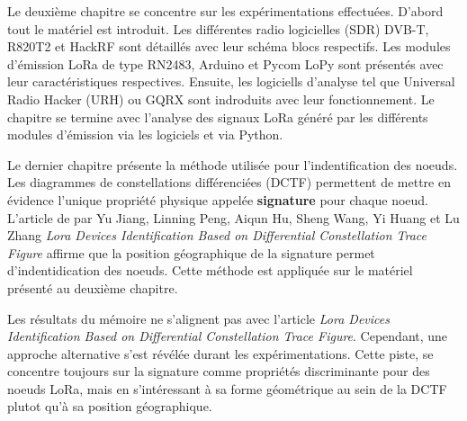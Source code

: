 \documentclass[a4paper,11pt]{article}
\begin{document}
\vspace{0.2cm}

\noindent Le deuxième chapitre se concentre sur les expérimentations effectuées. D'abord tout le matériel est introduit. Les différentes radio logicielles (SDR) DVB-T, R820T2 et HackRF sont détaillés avec leur schéma blocs respectifs. Les modules d'émission LoRa de type RN2483, Arduino et Pycom LoPy sont présentés avec leur caractéristiques respectives. Ensuite, les logiciells d'analyse tel que Universal Radio Hacker (URH) ou GQRX sont indroduits avec leur fonctionnement. Le chapitre se termine avec l'analyse des signaux LoRa généré par les différents modules d'émission via les logiciels et via Python. 

\vspace{0.2cm}

\noindent Le dernier chapitre présente la méthode utilisée pour l'indentification des noeuds. Les diagrammes de constellations différenciées (DCTF) permettent de mettre en évidence l'unique propriété physique appelée \textbf{signature} pour chaque noeud. L'article de par Yu Jiang, Linning Peng, Aiqun Hu, Sheng Wang, Yi Huang et Lu Zhang \textit{Lora Devices Identification Based on Differential Constellation Trace Figure} affirme que la position géographique de la signature permet d'indentidication des noeuds. Cette méthode est appliquée sur le matériel présenté au deuxième chapitre.

\vspace{0.2cm}

\noindent Les résultats du mémoire ne s'alignent pas avec l'article \textit{Lora Devices Identification Based on Differential Constellation Trace Figure}. Cependant, une approche alternative s'est révélée durant les expérimentations. Cette piste, se concentre toujours sur la signature comme propriétés discriminante pour des noeuds LoRa, mais en s'intéressant à sa forme géométrique au sein de la DCTF plutot qu'à sa position géographique.
\end{document}
